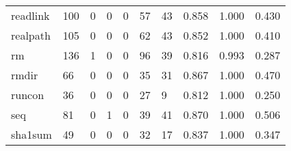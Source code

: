 \begin{longtable}{lp{2.0cm}p{2.0cm}p{2.0cm}p{2.0cm}p{2.0cm}p{2.0cm}p{2.0cm}p{2.0cm}p{2.0cm}}
readlink  &                    100 &                                             0 &                                            0 &                                           0 &                                           57 &                                         43 &                                0.858 &                                  1.000 &                                0.430 \\
realpath  &                    105 &                                             0 &                                            0 &                                           0 &                                           62 &                                         43 &                                0.852 &                                  1.000 &                                0.410 \\
rm        &                    136 &                                             1 &                                            0 &                                           0 &                                           96 &                                         39 &                                0.816 &                                  0.993 &                                0.287 \\
rmdir     &                     66 &                                             0 &                                            0 &                                           0 &                                           35 &                                         31 &                                0.867 &                                  1.000 &                                0.470 \\
runcon    &                     36 &                                             0 &                                            0 &                                           0 &                                           27 &                                          9 &                                0.812 &                                  1.000 &                                0.250 \\
seq       &                     81 &                                             0 &                                            1 &                                           0 &                                           39 &                                         41 &                                0.870 &                                  1.000 &                                0.506 \\
sha1sum   &                     49 &                                             0 &                                            0 &                                           0 &                                           32 &                                         17 &                                0.837 &                                  1.000 &                                0.347 \\

\end{longtable}
